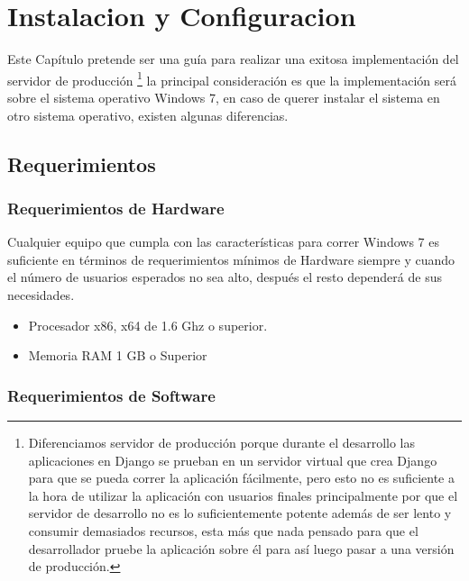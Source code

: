 ﻿\chapter{Instalacion y Configuracion}

Este Capítulo pretende ser una guía para realizar una exitosa implementación del servidor de producción \footnote{Diferenciamos servidor de producción porque durante el desarrollo las aplicaciones en Django se prueban en un servidor virtual que crea Django para que se pueda correr la aplicación fácilmente, pero esto no es suficiente a la hora de utilizar la aplicación con usuarios finales principalmente por que el servidor de desarrollo no es lo suficientemente potente además de ser lento y consumir demasiados recursos, esta más que nada pensado para que el desarrollador pruebe la aplicación sobre él para así luego pasar a una versión de producción. } la principal consideración es que la implementación será sobre el sistema operativo Windows 7, en caso de querer instalar el sistema en otro sistema operativo, existen algunas diferencias. \\[0.5cm]

\section{Requerimientos}

\subsection{Requerimientos de Hardware}

Cualquier equipo que cumpla con las características para correr Windows 7 es suficiente en términos de requerimientos mínimos de Hardware siempre y cuando el número de usuarios esperados no sea alto, después el resto dependerá de sus necesidades. \\[0.5cm]

\begin{itemize}
    \item Procesador x86, x64 de 1.6 Ghz o superior.
    \item Memoria RAM 1 GB o Superior 
\end{itemize}


\subsection{Requerimientos de Software}


